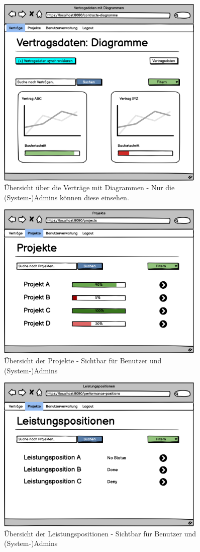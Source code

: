 \begin{figure}[h]
\centering
\includegraphics[width=10cm]{img/mockup_web/admin-vertraege-diagramme.png}
\caption{Übersicht über die Verträge mit Diagrammen - Nur die (System-)Admins können diese einsehen.}
\end{figure}

\begin{figure}[h]
\centering
\includegraphics[width=10cm]{img/mockup_web/admin-und-benutzer-projekte.png}
\caption{Übersicht der Projekte - Sichtbar für Benutzer und (System-)Admins}
\end{figure}

\begin{figure}[h]
\centering
\includegraphics[width=10cm]{img/mockup_web/admin-und-benutzer-leistungspositionen.png}
\caption{Übersicht der Leistungspositionen - Sichtbar für Benutzer und (System-)Admins}
\end{figure}

